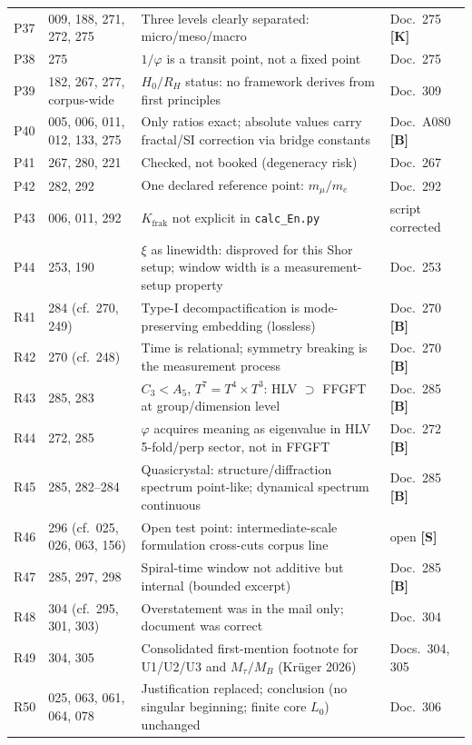 \begin{longtable}{@{}p{1.2cm}p{3.4cm}p{5.8cm}p{3.4cm}@{}}
P37 & 009, 188, 271, 272, 275 & Three levels clearly separated: micro/meso/macro & Doc.~275 \textbf{[K]} \\
P38 & 275 & $1/\varphi$ is a transit point, not a fixed point & Doc.~275 \\
P39 & 182, 267, 277, corpus-wide & $H_0/R_H$ status: no framework derives from first principles & Doc.~309 \\
P40 & 005, 006, 011, 012, 133, 275 & Only ratios exact; absolute values carry fractal/SI correction via bridge constants & Doc.~A080 \textbf{[B]} \\
P41 & 267, 280, 221 & Checked, not booked (degeneracy risk) & Doc.~267 \\
P42 & 282, 292 & One declared reference point: $m_\mu/m_e$ & Doc.~292 \\
P43 & 006, 011, 292 & $K_{\text{frak}}$ not explicit in \texttt{calc\_En.py} & script corrected \\
P44 & 253, 190 & $\xi$ as linewidth: disproved for this Shor setup; window width is a measurement-setup property & Doc.~253 \\
R41 & 284 (cf.\ 270, 249) & Type-I decompactification is mode-preserving embedding (lossless) & Doc.~270 \textbf{[B]} \\
R42 & 270 (cf.\ 248) & Time is relational; symmetry breaking is the measurement process & Doc.~270 \textbf{[B]} \\
R43 & 285, 283 & $C_3<A_5$, $T^7=T^4\times T^3$: HLV $\supset$ FFGFT at group/dimension level & Doc.~285 \textbf{[B]} \\
R44 & 272, 285 & $\varphi$ acquires meaning as eigenvalue in HLV 5-fold/perp sector, not in FFGFT & Doc.~272 \textbf{[B]} \\
R45 & 285, 282--284 & Quasicrystal: structure/diffraction spectrum point-like; dynamical spectrum continuous & Doc.~285 \textbf{[B]} \\
R46 & 296 (cf.\ 025, 026, 063, 156) & Open test point: intermediate-scale formulation cross-cuts corpus line & open \textbf{[S]} \\
R47 & 285, 297, 298 & Spiral-time window not additive but internal (bounded excerpt) & Doc.~285 \textbf{[B]} \\
R48 & 304 (cf.\ 295, 301, 303) & Overstatement was in the mail only; document was correct & Doc.~304 \\
R49 & 304, 305 & Consolidated first-mention footnote for U1/U2/U3 and $M_\tau/M_B$ (Krüger 2026) & Docs.~304, 305 \\
R50 & 025, 063, 061, 064, 078 & Justification replaced; conclusion (no singular beginning; finite core $L_0$) unchanged & Doc.~306 \\

\end{longtable}

